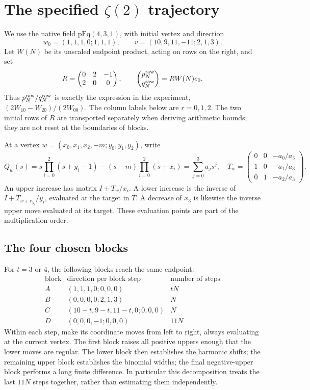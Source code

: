 \documentclass[11pt]{article}
\begin{document}
\section{The specified $\zeta(2)$ trajectory}
We use the native field $\mathrm{pFq}(4,3,1)$, with initial vertex and direction
\[
 w_0=(1,1,1,0;1,1,1),\qquad v=(10,9,11,-11;2,1,3).
\]
Let $W(N)$ be its unscaled endpoint product, acting on rows on the right,
and set
\[
 R=\begin{pmatrix}0&2&-1\\2&0&0\end{pmatrix},\qquad
 \binom{p_N^{\rm raw}}{q_N^{\rm raw}}=RW(N)e_0.
\]
Thus $p_N^{\rm raw}/q_N^{\rm raw}$ is exactly the expression in the
experiment, $(2W_{10}-W_{20})/(2W_{00})$.
The column labels below are $r=0,1,2$.
The two initial rows of $R$ are transported separately when deriving
arithmetic bounds; they are not reset at the boundaries of blocks.

At a vertex $w=(x_0,x_1,x_2,-m;y_0,y_1,y_2)$, write
\[
 Q_w(s)=s\prod_{i=0}^2(s+y_i-1)-(s-m)\prod_{i=0}^2(s+x_i)
       =\sum_{j=0}^3a_js^j,
\quad
 T_w=\begin{pmatrix}0&0&-a_0/a_3\\1&0&-a_1/a_3\\0&1&-a_2/a_3\end{pmatrix}.
\]
An upper increase has matrix $I+T_w/x_i$. A lower increase is the
inverse of $I+T_{w+e_{y_i}}/y_i$, evaluated at the target in $T$.
A decrease of $x_3$ is likewise the inverse upper move evaluated at
its target. These evaluation points are part of the multiplication order.

\subsection{The four chosen blocks}
For $t=3$ or $4$, the following blocks reach the same endpoint:
\[
\begin{array}{c|c|c}
\text{block}&\text{direction per block step}&\text{number of steps}\\\hline
A&(1,1,1,0;0,0,0)&tN\\
B&(0,0,0,0;2,1,3)&N\\
C&(10-t,9-t,11-t,0;0,0,0)&N\\
D&(0,0,0,-1;0,0,0)&11N
\end{array}
\]
Within each step, make its coordinate moves from left to right, always
evaluating at the current vertex. The first block raises all positive
uppers enough that the lower moves are regular. The lower block then
establishes the harmonic shifts; the remaining upper block establishes
the binomial widths; the final negative-upper block performs a long
finite difference. In particular this decomposition treats the last
$11N$ steps together, rather than estimating them independently.
\end{document}
